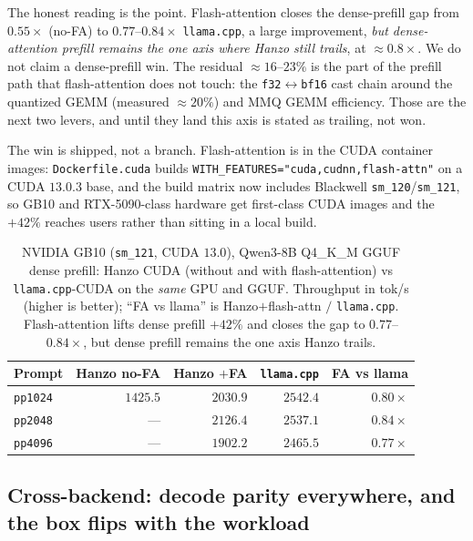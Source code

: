 \documentclass[11pt]{article}
\begin{document}
The honest reading is the point. Flash-attention closes the dense-prefill gap from $0.55\times$ (no-FA)
to $\mathbf{0.77}$--$\mathbf{0.84\times}$ \texttt{llama.cpp}, a large improvement, \emph{but
dense-attention prefill remains the one axis where Hanzo still trails}, at $\approx 0.8\times$. We do not
claim a dense-prefill win. The residual $\approx 16$--$23\%$ is the part of the prefill path that
flash-attention does not touch: the \texttt{f32}$\leftrightarrow$\texttt{bf16} cast chain around the
quantized GEMM (measured $\approx 20\%$) and MMQ GEMM efficiency. Those are the next two levers, and
until they land this axis is stated as trailing, not won.

The win is shipped, not a branch. Flash-attention is in the CUDA container images:
\texttt{Dockerfile.cuda} builds \texttt{WITH\_FEATURES="cuda,cudnn,flash-attn"} on a CUDA $13.0.3$
base, and the build matrix now includes Blackwell \texttt{sm\_120}/\texttt{sm\_121}, so GB10 and
RTX-5090-class hardware get first-class CUDA images and the $+42\%$ reaches users rather than sitting in
a local build.

\begin{table}[t]
\centering
\caption{NVIDIA GB10 (\texttt{sm\_121}, CUDA $13.0$), Qwen3-8B Q4\_K\_M GGUF dense prefill: Hanzo CUDA
(without and with flash-attention) vs \texttt{llama.cpp}-CUDA on the \emph{same} GPU and GGUF.
Throughput in tok/s (higher is better); ``FA vs llama'' is Hanzo$+$flash-attn $/$ \texttt{llama.cpp}.
Flash-attention lifts dense prefill $+42\%$ and closes the gap to $0.77$--$0.84\times$, but dense
prefill remains the one axis Hanzo trails.}
\label{tab:flashattn}
\begin{tabular}{l rrr r}
\toprule
\textbf{Prompt} & \textbf{Hanzo no-FA} & \textbf{Hanzo $+$FA} & \textbf{\texttt{llama.cpp}} & \textbf{FA vs llama} \\
\midrule
\texttt{pp1024} & $1425.5$ & $2030.9$ & $2542.4$ & $0.80\times$ \\
\texttt{pp2048} & ---      & $2126.4$ & $2537.1$ & $0.84\times$ \\
\texttt{pp4096} & ---      & $1902.2$ & $2465.5$ & $0.77\times$ \\
\bottomrule
\end{tabular}
\end{table}

\subsection{Cross-backend: decode parity everywhere, and the box flips with the workload}
\label{sec:crossbackend}
\end{document}
